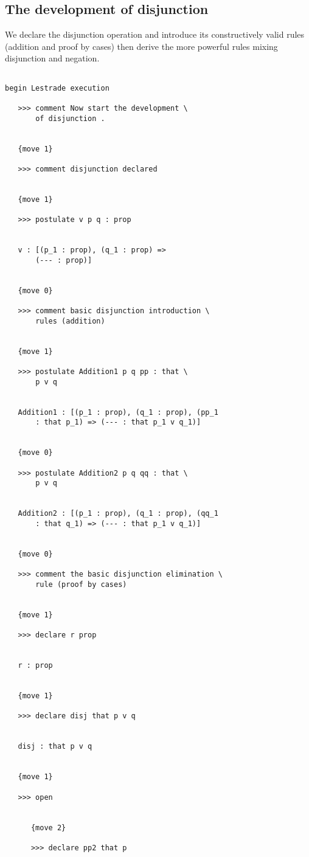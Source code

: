 \documentclass[12pt]{article}
\begin{document}
\subsection{The development of disjunction}

We declare the disjunction operation and introduce its constructively valid rules (addition and proof by cases)  then derive the more powerful rules mixing disjunction and negation.

\begin{verbatim}

begin Lestrade execution

   >>> comment Now start the development \
       of disjunction .


   {move 1}

   >>> comment disjunction declared


   {move 1}

   >>> postulate v p q : prop


   v : [(p_1 : prop), (q_1 : prop) => 
       (--- : prop)]


   {move 0}

   >>> comment basic disjunction introduction \
       rules (addition)


   {move 1}

   >>> postulate Addition1 p q pp : that \
       p v q


   Addition1 : [(p_1 : prop), (q_1 : prop), (pp_1 
       : that p_1) => (--- : that p_1 v q_1)]


   {move 0}

   >>> postulate Addition2 p q qq : that \
       p v q


   Addition2 : [(p_1 : prop), (q_1 : prop), (qq_1 
       : that q_1) => (--- : that p_1 v q_1)]


   {move 0}

   >>> comment the basic disjunction elimination \
       rule (proof by cases)


   {move 1}

   >>> declare r prop


   r : prop


   {move 1}

   >>> declare disj that p v q


   disj : that p v q


   {move 1}

   >>> open


      {move 2}

      >>> declare pp2 that p



\end{verbatim}
\end{document}
